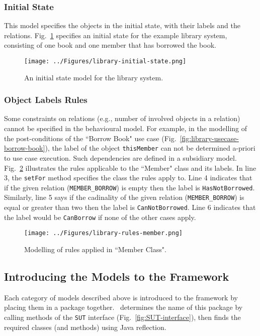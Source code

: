\subsubsection{Initial State}
\label{sec:subsidiary-models-initial-state}
This model specifies the objects in the initial state, with their labels and the relations. Fig.~\ref{fig:library-initial-state} specifies an initial state for the example library system, consisting of one book and one member that has borrowed the book.

\begin{figure}[h]
\centering
\texttt{[image: ../Figures/library-initial-state.png]}
\caption{An initial state model for the library system.}
\label{fig:library-initial-state}
\end{figure}

\subsubsection{Object Labels Rules}
\label{sec:subsidiary-models-object-labels}
Some constraints on relations (e.g., number of involved objects in a relation) cannot be specified in the behavioural model. For example, in the modelling of the post-conditions of the ``Borrow Book" use case (Fig.~\ref{fig:library-usecase-borrow-book}), the label of the object \texttt{thisMember} can not be determined a-priori to use case execution. 
Such dependencies are defined in a subsidiary model. Fig.~\ref{fig:library-rules-member} illustrates the rules applicable to the ``Member" class and its labels. In line 3, the \texttt{setFor} method specifies the class the rules apply to. Line 4 indicates that if the given relation (\texttt{MEMBER\_BORROW}) is empty then the label is \texttt{HasNotBorrowed}. Similarly, line 5 says if the cadinality of the given relation (\texttt{MEMBER\_BORROW}) is equal or greater than two then the label is \texttt{CanNotBorrowed}. Line 6 indicates that the label would be \texttt{CanBorrow} if none of the other cases apply.

\begin{figure}[h]
\centering
\texttt{[image: ../Figures/library-rules-member.png]}
\caption{Modelling of rules applied in ``Member Class".}
\label{fig:library-rules-member}
\end{figure}

\subsection{Introducing the Models to the Framework}
\label{sec:create-test model-introducing-models}
Each category of models described above is introduced to the framework by placing them in a package together.
\this~determines the name of this package by calling methods of the \texttt{SUT} interface (Fig.~\ref{fig:SUT-interface}), then finds the required classes (and methods) using Java reflection.


